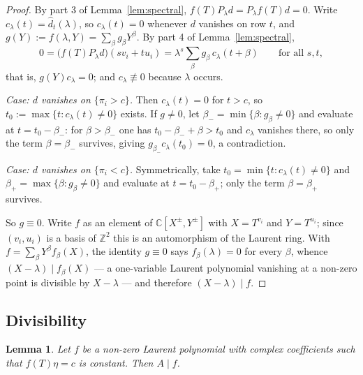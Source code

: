 \documentclass[11pt,reqno]{amsart}
\theoremstyle{plain}
\newtheorem{lem}[thm]{Lemma}
\theoremstyle{definition}
\theoremstyle{remark}
\theoremstyle{plain}
\theoremstyle{remark}
\theoremstyle{definition}
\numberwithin{equation}{section}
\newcommand{\Z}{\mathbb{Z}}
\newcommand{\C}{\mathbb{C}}
\begin{document}
\begin{proof}
By part 3 of Lemma~\ref{lem:spectral}, $f(T)P_\lambda d=P_\lambda f(T)d=0$.
Write $c_\lambda(t)=\widehat d_t(\lambda)$, so $c_\lambda(t)=0$ whenever $d$
vanishes on row $t$, and $g(Y):=f(\lambda,Y)=\sum_\beta g_\beta Y^\beta$.  By
part 4 of Lemma~\ref{lem:spectral},
\[0=\bigl(f(T)P_\lambda d\bigr)(sv_i+tu_i)
  =\lambda^s\sum_\beta g_\beta\,c_\lambda(t+\beta)\qquad\text{for all }s,t,\]
that is, $g(Y)c_\lambda=0$; and $c_\lambda\not\equiv0$ because $\lambda$
occurs.

\emph{Case: $d$ vanishes on $\{\pi_i>c\}$.}  Then $c_\lambda(t)=0$ for $t>c$, so
$t_0:=\max\{t:c_\lambda(t)\ne0\}$ exists.  If $g\ne0$, let
$\beta_-=\min\{\beta:g_\beta\ne0\}$ and evaluate at $t=t_0-\beta_-$: for
$\beta>\beta_-$ one has $t_0-\beta_-+\beta>t_0$ and $c_\lambda$ vanishes there,
so only the term $\beta=\beta_-$ survives, giving
$g_{\beta_-}c_\lambda(t_0)=0$, a contradiction.

\emph{Case: $d$ vanishes on $\{\pi_i<c\}$.}  Symmetrically, take
$t_0=\min\{t:c_\lambda(t)\ne0\}$ and $\beta_+=\max\{\beta:g_\beta\ne0\}$ and
evaluate at $t=t_0-\beta_+$; only the term $\beta=\beta_+$ survives.

So $g\equiv0$.  Write $f$ as an element of $\C[X^{\pm},Y^{\pm}]$ with
$X=T^{v_i}$ and $Y=T^{u_i}$; since $(v_i,u_i)$ is a basis of $\Z^2$ this is an
automorphism of the Laurent ring.  With $f=\sum_\beta Y^\beta f_\beta(X)$, the
identity $g\equiv0$ says $f_\beta(\lambda)=0$ for every $\beta$, whence
$(X-\lambda)\mid f_\beta(X)$ — a one-variable Laurent polynomial vanishing at a
non-zero point is divisible by $X-\lambda$ — and therefore $(X-\lambda)\mid f$.
\end{proof}

\subsection{Divisibility}\label{ssec:divisibility}

\begin{lem}\label{lem:divisibility}
Let $f$ be a non-zero Laurent polynomial with complex coefficients such that
$f(T)\eta=c$ is constant.  Then $A\mid f$.
\end{lem}
\end{document}
